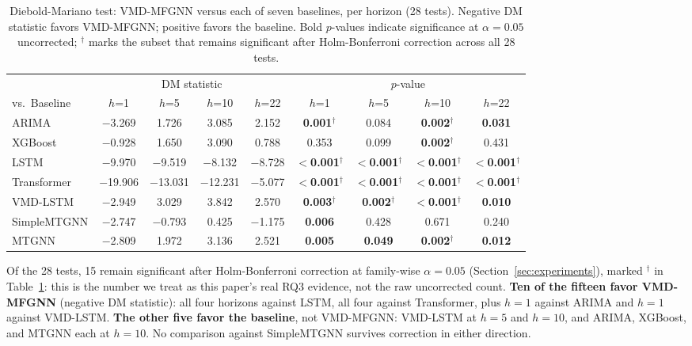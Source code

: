 \documentclass[journal]{IEEEtran}
\begin{document}
\begin{table}[!t]
\centering
\caption{Diebold-Mariano test: VMD-MFGNN versus each of seven baselines, per horizon (28 tests). Negative DM statistic favors VMD-MFGNN; positive favors the baseline. Bold $p$-values indicate significance at $\alpha=0.05$ uncorrected; $^{\dagger}$ marks the subset that remains significant after Holm-Bonferroni correction across all 28 tests.}
\label{tab:dm}
\begin{tabular}{l cccc cccc}
\toprule
& \multicolumn{4}{c}{DM statistic} & \multicolumn{4}{c}{$p$-value} \\
\cmidrule(lr){2-5} \cmidrule(lr){6-9}
vs.\ Baseline & $h$=1 & $h$=5 & $h$=10 & $h$=22 & $h$=1 & $h$=5 & $h$=10 & $h$=22 \\
\midrule
ARIMA        & $-$3.269 & 1.726 & 3.085 & 2.152 & \textbf{0.001}$^{\dagger}$ & 0.084 & \textbf{0.002}$^{\dagger}$ & \textbf{0.031} \\
XGBoost      & $-$0.928 & 1.650 & 3.090 & 0.788 & 0.353 & 0.099 & \textbf{0.002}$^{\dagger}$ & 0.431 \\
LSTM         & $-$9.970 & $-$9.519 & $-$8.132 & $-$8.728 & \textbf{$<$0.001}$^{\dagger}$ & \textbf{$<$0.001}$^{\dagger}$ & \textbf{$<$0.001}$^{\dagger}$ & \textbf{$<$0.001}$^{\dagger}$ \\
Transformer  & $-$19.906 & $-$13.031 & $-$12.231 & $-$5.077 & \textbf{$<$0.001}$^{\dagger}$ & \textbf{$<$0.001}$^{\dagger}$ & \textbf{$<$0.001}$^{\dagger}$ & \textbf{$<$0.001}$^{\dagger}$ \\
VMD-LSTM     & $-$2.949 & 3.029 & 3.842 & 2.570 & \textbf{0.003}$^{\dagger}$ & \textbf{0.002}$^{\dagger}$ & \textbf{$<$0.001}$^{\dagger}$ & \textbf{0.010} \\
SimpleMTGNN  & $-$2.747 & $-$0.793 & 0.425 & $-$1.175 & \textbf{0.006} & 0.428 & 0.671 & 0.240 \\
MTGNN        & $-$2.809 & 1.972 & 3.136 & 2.521 & \textbf{0.005} & \textbf{0.049} & \textbf{0.002}$^{\dagger}$ & \textbf{0.012} \\
\bottomrule
\end{tabular}
\end{table}

\FloatBarrier

Of the 28 tests, 15 remain significant after Holm-Bonferroni correction at family-wise $\alpha=0.05$ (Section~\ref{sec:experiments}), marked $^{\dagger}$ in Table~\ref{tab:dm}: this is the number we treat as this paper's real RQ3 evidence, not the raw uncorrected count. \textbf{Ten of the fifteen favor VMD-MFGNN} (negative DM statistic): all four horizons against LSTM, all four against Transformer, plus $h=1$ against ARIMA and $h=1$ against VMD-LSTM. \textbf{The other five favor the baseline}, not VMD-MFGNN: VMD-LSTM at $h=5$ and $h=10$, and ARIMA, XGBoost, and MTGNN each at $h=10$. No comparison against SimpleMTGNN survives correction in either direction.
\end{document}
